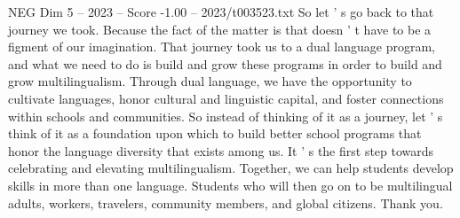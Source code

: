 \begin{textsample}{NEG Dim 5 – 2023 – Score -1.00 – 2023/t003523.txt}
So let ' s go back to that journey we took.
Because the fact of the matter is that doesn ' t have to be a figment of our imagination.
That journey took us to a dual language program, and what we need to do is build and grow these programs in order to build and grow multilingualism.
Through dual language, we have the opportunity to cultivate languages, honor cultural and linguistic capital, and foster connections within schools and communities.
So instead of thinking of it as a journey, let ' s think of it as a foundation upon which to build better school programs that honor the language diversity that exists among us.
It ' s the first step towards celebrating and elevating multilingualism.
Together, we can help students develop skills in more than one language.
Students who will then go on to be multilingual adults, workers, travelers, community members, and global citizens.
Thank you.

\end{textsample}
